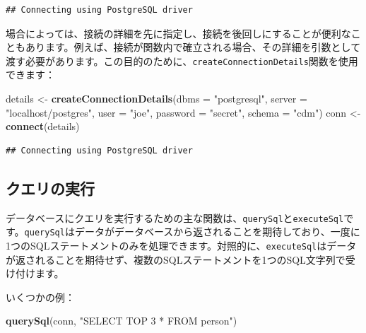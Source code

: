 \documentclass[
  11pt]{book}
\newenvironment{Shaded}{\begin{snugshade}}{\end{snugshade}}
\newcommand{\AttributeTok}[1]{\textcolor[rgb]{0.13,0.29,0.53}{#1}}
\newcommand{\FunctionTok}[1]{\textcolor[rgb]{0.13,0.29,0.53}{\textbf{#1}}}
\newcommand{\NormalTok}[1]{#1}
\newcommand{\OtherTok}[1]{\textcolor[rgb]{0.56,0.35,0.01}{#1}}
\newcommand{\StringTok}[1]{\textcolor[rgb]{0.31,0.60,0.02}{#1}}
\theoremstyle{definition}
\theoremstyle{definition}
\theoremstyle{definition}
\theoremstyle{definition}
\theoremstyle{remark}
\begin{document}
\begin{verbatim}
## Connecting using PostgreSQL driver
\end{verbatim}

場合によっては、接続の詳細を先に指定し、接続を後回しにすることが便利なこともあります。例えば、接続が関数内で確立される場合、その詳細を引数として渡す必要があります。この目的のために、\texttt{createConnectionDetails}関数を使用できます：

\begin{Shaded}
\begin{Highlighting}[]
\NormalTok{details }\OtherTok{\textless{}{-}} \FunctionTok{createConnectionDetails}\NormalTok{(}\AttributeTok{dbms =} \StringTok{"postgresql"}\NormalTok{,}
                                   \AttributeTok{server =} \StringTok{"localhost/postgres"}\NormalTok{,}
                                   \AttributeTok{user =} \StringTok{"joe"}\NormalTok{,}
                                   \AttributeTok{password =} \StringTok{"secret"}\NormalTok{,}
                                   \AttributeTok{schema =} \StringTok{"cdm"}\NormalTok{)}
\NormalTok{conn }\OtherTok{\textless{}{-}} \FunctionTok{connect}\NormalTok{(details)}
\end{Highlighting}
\end{Shaded}

\begin{verbatim}
## Connecting using PostgreSQL driver
\end{verbatim}

\subsection{クエリの実行}\label{ux30afux30a8ux30eaux306eux5b9fux884c}

データベースにクエリを実行するための主な関数は、\texttt{querySql}と\texttt{executeSql}です。\texttt{querySql}はデータがデータベースから返されることを期待しており、一度に1つのSQLステートメントのみを処理できます。対照的に、\texttt{executeSql}はデータが返されることを期待せず、複数のSQLステートメントを1つのSQL文字列で受け付けます。 

いくつかの例：

\begin{Shaded}
\begin{Highlighting}[]
\FunctionTok{querySql}\NormalTok{(conn, }\StringTok{"SELECT TOP 3 * FROM person"}\NormalTok{)}
\end{Highlighting}
\end{Shaded}
\end{document}

